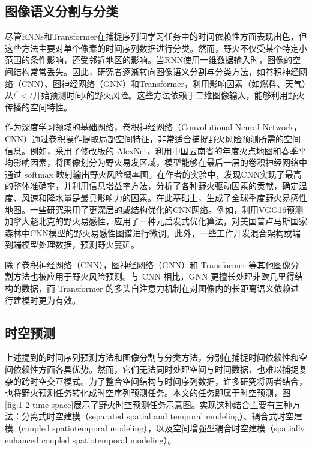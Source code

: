 \subsection{图像语义分割与分类}
尽管RNNs和Transformer在捕捉序列间学习任务中的时间依赖性方面表现出色，但这些方法主要对单个像素的时间序列数据进行分类。然而，野火不仅受某个特定小范围的条件影响，还受邻近地区的影响。当RNN使用一维数据输入时，图像的空间结构常常丢失\cite{hu2020spatial}。因此，研究者逐渐转向图像语义分割与分类方法，如卷积神经网络（CNN）、图神经网络（GNN）和Transformer，利用影响因素（如燃料、天气）从$t^{'}<t$开始预测时间$t$的野火风险。这些方法依赖于二维图像输入，能够利用野火传播的空间特性。

作为深度学习领域的基础网络，卷积神经网络（Convolutional Neural Network，CNN）通过卷积操作提取局部空间特征，非常适合捕捉野火风险预测所需的空间信息。例如，\textcite{zhang2019forest}采用了修改版的 AlexNet\cite{krizhevsky2012imagenet}，利用中国云南省的年度火点地图和春季平均影响因素，将图像划分为野火易发区域，模型能够在最后一层的卷积神经网络中通过 softmax 映射输出野火风险概率图。在作者的实验中，发现CNN实现了最高的整体准确率，并利用信息增益率方法，分析了各种野火驱动因素的贡献，确定温度、风速和降水量是最具影响力的因素。在此基础上，生成了全球季度野火易感性地图\cite{zhang2021deep}。一些研究采用了更深层的或结构优化的CNN网络。例如，\textcite{oak2024novel}利用VGG16预测加拿大魁北克的野火易感性，\textcite{nur2022creation}应用了一种元启发式优化算法，对美国普卢马斯国家森林中CNN模型的野火易感性图谱进行微调。此外，一些工作开发混合架构或端到端模型处理数据，预测野火蔓延\cite{allaire2021emulation,li2023predicting}。

除了卷积神经网络（CNN），图神经网络（GNN）和 Transformer 等其他图像分割方法也被应用于野火风险预测。与 CNN 相比，GNN 更擅长处理非欧几里得结构的数据\cite{jiang2022modeling}，而 Transformer 的多头自注意力机制在对图像内的长距离语义依赖进行建模时更为有效。

\subsection{时空预测}
\label{sec:1-2-spatiotemporal-prediction}
上述提到的时间序列预测方法和图像分割与分类方法，分别在捕捉时间依赖性和空间依赖性方面各具优势。然而，它们无法同时处理空间与时间数据，也难以捕捉复杂的跨时空交互模式\cite{prapas2021deep}。为了整合空间结构与时间序列数据，许多研究将两者结合，也将野火预测任务转化成时空序列预测任务。本文的任务即属于时空预测，图\ref{fig:1-2-time-space}展示了野火时空预测任务示意图。实现这种结合主要有三种方法：分离式时空建模（separated spatial and temporal modeling）、耦合式时空建模（coupled spatiotemporal modeling），以及空间增强型耦合时空建模（spatially enhanced coupled spatiotemporal modeling）\cite{xu2025deep}。

